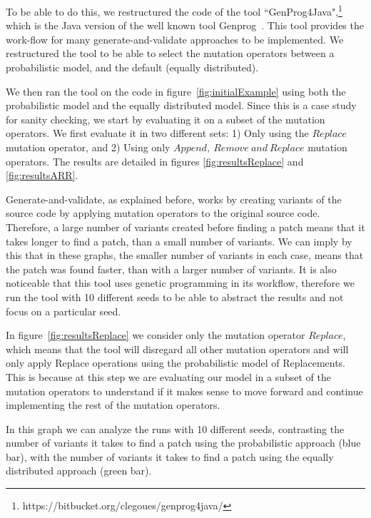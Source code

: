 \documentclass[conference]{IEEEtran}
\begin{document}

To be able to do this, we restructured the code of the tool ``GenProg4Java",\footnote{https://bitbucket.org/clegoues/genprog4java/} which is the Java version of the 
well known tool Genprog~\cite{legoues12}. This tool provides the work-flow 
for many generate-and-validate approaches to be implemented. We restructured the 
tool to be able to select the mutation operators between a 
probabilistic model, and the default (equally distributed).

We then ran the tool on the code in figure~\ref{fig:initialExample} using both 
the probabilistic model and the equally distributed model. Since this is a 
case study for sanity checking, we start by evaluating it on a subset of 
the mutation operators. We first evaluate it in two different sets: 1) Only using the $Replace$ mutation operator, and 2) Using only $Append,~
Remove~and~Replace$ mutation operators. The results are detailed in figures 
\ref{fig:resultsReplace} and \ref{fig:resultsARR}. 

Generate-and-validate, as explained before, works by creating variants of the 
source code by applying mutation operators to the original source code. 
Therefore, a large number of variants created before finding a patch means that 
it takes longer to find a patch, than a small number of variants. We can imply by this 
that in these graphs, the smaller number of variants in each case, means that 
the patch was found faster, than with a larger number of variants. It is also 
noticeable that this tool uses genetic programming in its workflow, therefore we 
run the tool with 10 different seeds to be able to abstract the results 
and not focus on a particular seed.

In figure~\ref{fig:resultsReplace} we consider only the mutation operator 
$Replace$, which means that the tool will disregard all other mutation 
operators and will only apply Replace operations using the probabilistic model 
of Replacements. This is because at this step we are evaluating our model in a 
subset of the mutation operators to understand if it makes sense to move forward and 
continue implementing the rest of the mutation operators.

In this graph we can analyze the runs with 10 different seeds, contrasting the 
number of variants it takes to find a patch using the probabilistic approach 
(blue bar), with the number of variants it takes to find a patch using the 
equally distributed approach (green bar). 
\end{document}
